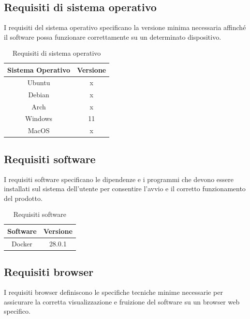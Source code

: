 \documentclass[10pt]{article}
\begin{document}
\begin{justify}
\subsection{Requisiti di sistema operativo}
I requisiti del sistema operativo specificano la versione minima necessaria affinché il software possa funzionare correttamente su un determinato dispositivo.

\begin{table}[H]
    \centering
    \begin{tabular}{|c|c|}
        \hline
        \rowcolor{gray!25}
        Sistema Operativo & Versione \\
        \hline
        Ubuntu & x\\ %
        \hline
        Debian & x\\ %
        \hline
        Arch & x\\ %
        \hline
        Windows & 11\\
        \hline
        MacOS & x\\ %
        \hline
    \end{tabular}
    \caption{Requisiti di sistema operativo}
    \label{tab:requisiti_sistema}
\end{table}

\subsection{Requisiti software}
I requisiti software specificano le dipendenze e i programmi che devono essere installati sul sistema dell’utente per consentire l’avvio e il corretto funzionamento del prodotto.

\begin{table}[H]
    \centering
    \begin{tabular}{|c|c|}
        \hline
        \rowcolor{gray!25}
        Software & Versione \\
        \hline
        Docker & 28.0.1\\
        \hline
    \end{tabular}
    \caption{Requisiti software}
    \label{tab:requisiti_software}
\end{table}

\subsection{Requisiti browser}
I requisiti browser definiscono le specifiche tecniche minime necessarie per assicurare la corretta visualizzazione e fruizione del software su un browser web specifico.


\end{justify}
\end{document}
